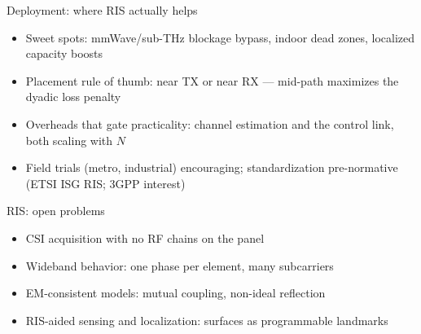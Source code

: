 \begin{frame}{Deployment: where RIS actually helps}
  \begin{itemize}\itemsep2pt
    \item Sweet spots: mmWave/sub-THz \alert{blockage bypass}, indoor dead
          zones, localized capacity boosts
    \item Placement rule of thumb: near TX or near RX --- mid-path maximizes the
          dyadic loss penalty
    \item Overheads that gate practicality: channel estimation and the control
          link, both scaling with $N$
    \item Field trials (metro, industrial) encouraging; standardization
          pre-normative (ETSI ISG RIS; 3GPP interest)
  \end{itemize}
\end{frame}

\begin{frame}{RIS: open problems}
  \begin{itemize}\itemsep2pt
    \item CSI acquisition with no RF chains on the panel
    \item Wideband behavior: one phase per element, many subcarriers
    \item EM-consistent models: mutual coupling, non-ideal reflection
    \item RIS-aided sensing and localization: surfaces as programmable
          landmarks
  \end{itemize}
\end{frame}

